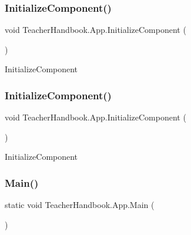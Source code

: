\subsubsection{\texorpdfstring{Initialize\+Component()}{InitializeComponent()}\hspace{0.1cm}{\footnotesize\ttfamily [3/4]}}
{\footnotesize\ttfamily void Teacher\+Handbook.\+App.\+Initialize\+Component (\begin{DoxyParamCaption}{ }\end{DoxyParamCaption})}



Initialize\+Component 

\mbox{\label{class_teacher_handbook_1_1_app_afbffdf9e50df5c19ff2ea81241e322b2}} 
\subsubsection{\texorpdfstring{Initialize\+Component()}{InitializeComponent()}\hspace{0.1cm}{\footnotesize\ttfamily [4/4]}}
{\footnotesize\ttfamily void Teacher\+Handbook.\+App.\+Initialize\+Component (\begin{DoxyParamCaption}{ }\end{DoxyParamCaption})}



Initialize\+Component 

\mbox{\label{class_teacher_handbook_1_1_app_a023352bc757e3dc9fce26276dfdadd15}} 
\subsubsection{\texorpdfstring{Main()}{Main()}\hspace{0.1cm}{\footnotesize\ttfamily [1/4]}}
{\footnotesize\ttfamily static void Teacher\+Handbook.\+App.\+Main (\begin{DoxyParamCaption}{ }\end{DoxyParamCaption})\hspace{0.3cm}{\ttfamily [static]}}



